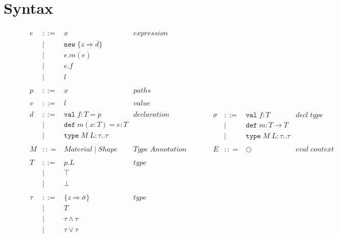 \documentclass{llncs}
\numberwithin{subcase}{casethm}
\numberwithin{casethm}{theorem}
\numberwithin{casethm}{lemma}
\begin{document}
\section{Syntax}

\begin{figure}[h]
\[
\begin{array}{lll}
\begin{array}{lllr}
e & ::= & x & expression \\
& | & \texttt{new} \; \{z \Rightarrow \overline{d}\}&\\
& | & e.m(e) &\\
& | & e.f &\\
& | & l &\\
&&\\
p & ::= & x & paths \\
&&\\
v & ::= & l & value \\
&&\\
d & ::= & \texttt{val} \; f : T = p & declaration \\
  & |   & \texttt{def} \; m(x:T) = e : T &\\
  & |   & \texttt{type} \; M \; L : \tau .. \tau&\\
&&\\
M & :: = & Material \; | \; Shape &  Type\; Annotation \\
&&\\
T & ::= & p.L & type \\
& | & \top & \\
& | & \bot & \\
&&\\
\tau & ::= & \{z \Rightarrow \overline{\sigma}\} & type \\
& | & T & \\
& | & \tau \wedge \tau & \\
& | & \tau \vee \tau & \\
 \end{array}
& ~~~~~~
&
\begin{array}{lllr}
\sigma & ::= & \texttt{val} \; f:T & decl \; type\\
       & |   & \texttt{def} \; m:T \rightarrow T \\
		 & |   & \texttt{type} \; M \; L : \tau .. \tau &\\
&&\\
E & :: = & \bigcirc & eval \; context\\

\end{array}
\end{array}\]
\end{figure}
\end{document}
